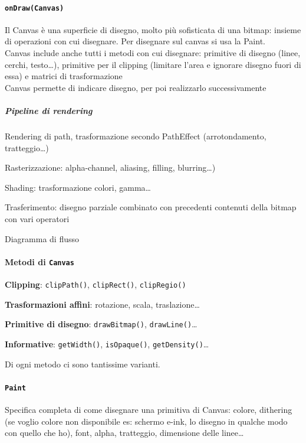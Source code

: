 \documentclass[10pt]{book}
\begin{document}
\paragraph{\texttt{onDraw(Canvas)}} Il Canvas è una superficie di disegno, molto più sofisticata di una bitmap: insieme di operazioni con cui disegnare. Per disegnare sul canvas si usa la Paint.\\
Canvas include anche tutti i metodi con cui disegnare: primitive di disegno (linee, cerchi, testo\ldots), primitive per il clipping (limitare l'area e ignorare disegno fuori di essa) e matrici di trasformazione\\
Canvas permette di indicare disegno, per poi realizzarlo successivamente
\subparagraph{Pipeline di rendering}
\begin{list}{}{}
	\item Rendering di path, trasformazione secondo PathEffect (arrotondamento, tratteggio\ldots)
	\item Rasterizzazione: alpha-channel, aliasing, filling, blurring\ldots)
	\item Shading: trasformazione colori, gamma\ldots
	\item Trasferimento: disegno parziale combinato con precedenti contenuti della bitmap con vari operatori
\end{list}
\begin{center}
	Diagramma di flusso
\end{center}
\paragraph{Metodi di \texttt{Canvas}}
\begin{list}{}{}
	\item \textbf{Clipping}: \texttt{clipPath()}, \texttt{clipRect()}, \texttt{clipRegio()}
	\item \textbf{Trasformazioni affini}: rotazione, scala, traslazione\ldots
	\item \textbf{Primitive di disegno}: \texttt{drawBitmap()}, \texttt{drawLine()}\ldots
	\item \textbf{Informative}: \texttt{getWidth()}, \texttt{isOpaque()}, \texttt{getDensity()}\ldots
\end{list}
Di ogni metodo ci sono tantissime varianti.
\paragraph{\texttt{Paint}} Specifica completa di come disegnare una primitiva di Canvas: colore, dithering (se voglio colore non disponibile es: schermo e-ink, lo disegno in qualche modo con quello che ho), font, alpha, tratteggio, dimensione delle linee\ldots
\end{document}
